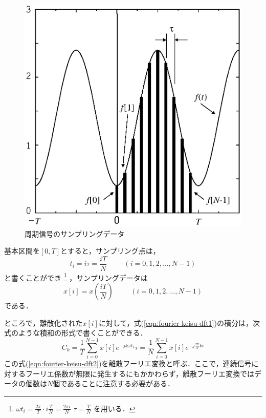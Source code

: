\begin{figure}[H]
\begin{center}
\includegraphics[width=.65\textwidth]{fig/shuki-sample-1.eps}
\caption{周期信号のサンプリングデータ}
\end{center}
\label{fig:shuki-singou1}
\end{figure}

基本区間を$[0,T]$とすると，サンプリング点は，
\begin{equation}
t_i=i\tau=\frac{iT}{N} \hspace{1cm} (i=0,1,2,\ldots,N-1)
\end{equation}
と書くことができ
\footnote{
$\displaystyle \omega t_i = \frac{2\pi}{T} \cdot i \frac{T}{N} %
 = \frac{2\pi i}{N}$
$\displaystyle \tau=\frac{T}{N}$
を用いる．
}
，サンプリングデータは
\begin{equation}
x[i]=x \left ( \frac{iT}{N} \right ) \hspace{1cm} (i=0,1,2,\ldots,N-1)
\end{equation}
である．

ところで，離散化された$x[i]$に対して，式(\ref{eqn:fourier-keisu-dft1})の積分は，次式のような積和の形式で書くことができる．
\begin{equation}
C_k = \frac{1}{T} \sum^{N-1}_{i=0} x[i] e^{-jk\omega t_i} \tau %
 = \frac{1}{N} \sum^{N-1}_{i=0} x[i] e^{-j\frac{2\pi}{N}ki}
\label{eqn:fourier-keisu-dft2}
\end{equation}
%
この式(\ref{eqn:fourier-keisu-dft2})を離散フーリエ変換と呼ぶ．ここで，連続信号に対するフーリエ係数が無限に発生するにもかかわらず，離散フーリエ変換ではデータの個数は$N$個であることに注意する必要がある．


